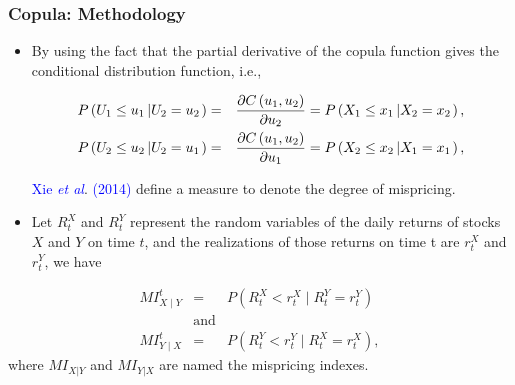\documentclass[pdf,9pt,xcolor=dvipsnames,hide notes]{beamer}
\begin{document}
\begin{frame}[label=frame4e]
	\frametitle{Copula: Methodology}
	
	
	\begin{itemize}
			\item By using the fact that the partial derivative of the copula function gives the conditional distribution function, i.e., 
			
			\begin{eqnarray*}
				P\left( U_{1}\leq u_{1}\left\vert U_{2}=u_{2}\right. \right)  &=&\frac{%
					\partial C\left( u_{1},u_{2}\right) }{\partial u_{2}}=P\left( X_{1}\leq
				x_{1}\left\vert X_{2}=x_{2}\right. \right) , \\
				P\left( U_{2}\leq u_{2}\left\vert U_{2}=u_{1}\right. \right)  &=&\frac{%
					\partial C\left( u_{1},u_{2}\right) }{\partial u_{1}}=P\left( X_{2}\leq
				x_{2}\left\vert X_{1}=x_{1}\right. \right), 
			\end{eqnarray*}
		
		\vspace{0.3cm}
			
			 \textcolor{blue}{Xie \emph{et al}}. \textcolor{blue}{(2014)} define a measure to denote the degree of mispricing.
	
\end{itemize}

\pause

\vspace{0.3cm}
		\begin{definition}
		\begin{itemize}
			\item Let $R_{t}^{X}$ and $R_{t}^{Y}$ represent the random variables of the daily returns of stocks $X$ and $Y$ on time $t$, and
			the realizations of those returns on time t are $r_{t}^{X}$ and $r_{t}^{Y}$, we have
		\end{itemize}
		\begin{eqnarray*}
			MI_{X\mid Y}^{t} & = & P(R_{t}^{X}<r_{t}^{X}\mid R_{t}^{Y}=r_{t}^{Y}) \\
			& \text{and}  & \\
			MI_{Y\mid X}^{t} & = & P(R_{t}^{Y}<r_{t}^{Y}\mid R_{t}^{X}=r_{t}^{X}),
		\end{eqnarray*}
		where $MI_{X|Y}$ and $MI_{Y|X}$ are named the mispricing indexes.
	\end{definition}
\end{frame}
\end{document}
